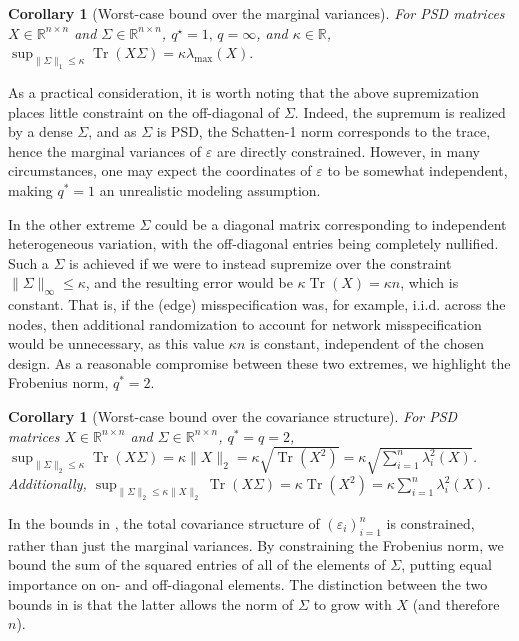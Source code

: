\documentclass[12pt]{article}
\newtheorem{corollary}[theorem]{Corollary}
\theoremstyle{definition}
\numberwithin{equation}{section}
\numberwithin{figure}{section}
\numberwithin{equation}{section}
\numberwithin{figure}{section}
\begin{document}
\begin{corollary}[Worst-case bound over the marginal variances] \label{variance_schatten_bound}
For PSD matrices $X \in \mathbb{R}^{n\times n}$ and $\Sigma \in \mathbb{R}^{n \times n}$, $q^\star = 1,\, q= \infty$, and $\kappa \in \mathbb{R}$, $\sup_{\|\Sigma\|_{1} \leq \kappa} \operatorname{Tr}(X\Sigma) = \kappa \lambda_{\text{max}} (X) .$
\end{corollary}

As a practical consideration, it is worth noting that the above supremization places little constraint on the off-diagonal of $\Sigma$. 
Indeed, the supremum is realized by a dense $\Sigma$, and as $\Sigma$ is PSD, the Schatten-1 norm corresponds to the trace, hence the marginal variances of $\varepsilon$ are directly constrained. 
However, in many circumstances, one may expect the coordinates of $\varepsilon$ to be somewhat independent, making $q^*=1$ an unrealistic modeling assumption.

In the other extreme $\Sigma$ could be a diagonal matrix corresponding to independent heterogeneous variation, with the off-diagonal entries being completely nullified. Such a $\Sigma$ is achieved if we were to instead supremize over the constraint $\|\Sigma\|_{\infty} \leq \kappa$, and the resulting error would be $\kappa\operatorname{Tr}(X) = \kappa n$, which is constant. That is, if the (edge) misspecification was, for example, i.i.d. across the nodes, then additional randomization to account for network misspecification would be unnecessary, as this value $\kappa n$ is constant, independent of the chosen design. As a reasonable compromise between these two extremes, we highlight the Frobenius norm, $q^*=2$.

\begin{corollary}[Worst-case bound over the covariance structure] \label{covariance_schatten_bound}
For PSD matrices $X \in \mathbb{R}^{n\times n}$  and $\Sigma \in \mathbb{R}^{n \times n}$, $q^*=q=2$, $\sup_{\|\Sigma\|_{2} \leq \kappa } \operatorname{Tr}(X\Sigma) = \kappa \| X\|_{2} = \kappa\sqrt{\operatorname{Tr}(X^2)} = \kappa \sqrt{\sum_{i=1}^n \lambda_{i}^2(X)}$.
Additionally, $\sup_{\|\Sigma\|_{2} \leq \kappa \| X\|_{2}} \operatorname{Tr}(X\Sigma) = \kappa\operatorname{Tr}(X^2) = \kappa \sum_{i=1}^n \lambda_{i}^2(X)$.
\end{corollary}

In the bounds in , the total covariance structure of $({\varepsilon}_i)_{i=1}^n$ is constrained, rather than just the marginal variances. By constraining the Frobenius norm, we bound the sum of the squared entries of all of the elements of $\Sigma$, putting equal importance on on- and off-diagonal elements. The distinction between the two bounds in  is that the latter allows the norm of $\Sigma$ to grow with $X$ (and therefore $n$).
\end{document}
